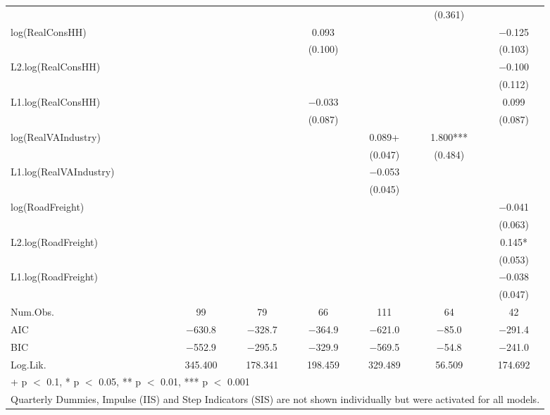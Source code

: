 \begin{table}
{\begin{tabular}[t]{lcccccc}
 &  &  &  &  & (\num{0.361}) & \\
log(RealConsHH) &  &  & \num{0.093} &  &  & \num{-0.125}\\
 &  &  & (\num{0.100}) &  &  & (\num{0.103})\\
L2.log(RealConsHH) &  &  &  &  &  & \num{-0.100}\\
 &  &  &  &  &  & (\num{0.112})\\
L1.log(RealConsHH) &  &  & \num{-0.033} &  &  & \num{0.099}\\
 &  &  & (\num{0.087}) &  &  & (\num{0.087})\\
log(RealVAIndustry) &  &  &  & \num{0.089}+ & \num{1.800}*** & \\
 &  &  &  & (\num{0.047}) & (\num{0.484}) & \\
L1.log(RealVAIndustry) &  &  &  & \num{-0.053} &  & \\
 &  &  &  & (\num{0.045}) &  & \\
log(RoadFreight) &  &  &  &  &  & \num{-0.041}\\
 &  &  &  &  &  & (\num{0.063})\\
L2.log(RoadFreight) &  &  &  &  &  & \num{0.145}*\\
 &  &  &  &  &  & (\num{0.053})\\
L1.log(RoadFreight) &  &  &  &  &  & \num{-0.038}\\
 &  &  &  &  &  & (\num{0.047})\\
\midrule
Num.Obs. & \num{99} & \num{79} & \num{66} & \num{111} & \num{64} & \num{42}\\
AIC & \num{-630.8} & \num{-328.7} & \num{-364.9} & \num{-621.0} & \num{-85.0} & \num{-291.4}\\
BIC & \num{-552.9} & \num{-295.5} & \num{-329.9} & \num{-569.5} & \num{-54.8} & \num{-241.0}\\
Log.Lik. & \num{345.400} & \num{178.341} & \num{198.459} & \num{329.489} & \num{56.509} & \num{174.692}\\
\bottomrule
\multicolumn{7}{l}{\rule{0pt}{1em}+ p $<$ 0.1, * p $<$ 0.05, ** p $<$ 0.01, *** p $<$ 0.001}\\
\multicolumn{7}{l}{\rule{0pt}{1em}Quarterly Dummies, Impulse (IIS) and Step Indicators (SIS) are not shown individually but were activated for all models.}\\
\end{tabular}}
\end{table}

